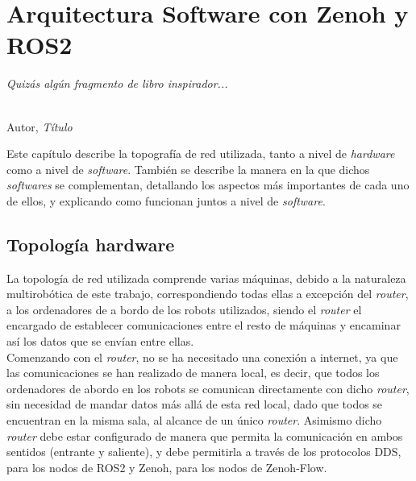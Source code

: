 \chapter{Arquitectura Software con Zenoh y ROS2}
\label{cap:capitulo4}

\begin{flushright}
\begin{minipage}[]{10cm}
\emph{Quizás algún fragmento de libro inspirador...}\\
\end{minipage}\\

Autor, \textit{Título}\\
\end{flushright}

\vspace{1cm}


Este capítulo describe la topografía de red utilizada, tanto a nivel de
\textit{hardware} como a nivel de \textit{software}.
También se describe la manera en la que dichos \textit{softwares} se
complementan, detallando los aspectos más importantes de cada uno de ellos, y
explicando como funcionan juntos a nivel de \textit{software}.



\section{Topología hardware}
\label{sec:topologia_hw}

La topología de red utilizada comprende varias máquinas, debido a la naturaleza
multirobótica de este trabajo, correspondiendo todas ellas a excepción del
\textit{router}, a los ordenadores de a bordo de los robots utilizados, siendo
el \textit{router} el encargado de establecer comunicaciones entre el resto de
máquinas y encaminar así los datos que se envían entre ellas.
\\

Comenzando con el \textit{router}, no se ha necesitado una conexión a internet,
ya que las comunicaciones se han realizado de manera local, es decir, que todos
los ordenadores de abordo en los robots se comunican directamente con dicho
\textit{router}, sin necesidad de mandar datos más allá de esta red local,
dado que todos se encuentran en la misma sala, al alcance de un único
\textit{router}.
Asimismo dicho \textit{router} debe estar configurado de manera que permita la
comunicación en ambos sentidos (entrante y saliente), y debe permitirla a través
de los protocolos DDS, para los nodos de ROS2 y Zenoh, para los nodos de
Zenoh-Flow.
\\

